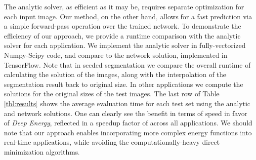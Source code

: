 \documentclass[journal]{IEEEtran}
\begin{document}
The analytic solver, as efficient as it may be, requires separate optimization for each input image. Our method, on the other hand, allows for a fast prediction via a simple forward-pass operation over the trained network. To demonstrate the efficiency of our approach, we provide a runtime comparison with the analytic solver for each application. We implement the analytic solver in fully-vectorized Numpy-Scipy code, and compare to the network solution, implemented in TensorFlow. Note that in seeded segmentation we compare the overall runtime of calculating the solution of the  images, along with the interpolation of the segmentation result back to original size. In other applications we compute the solutions for the original sizes of the test images.
The last row of Table \ref{tbl:results} shows the average evaluation time for each test set using the analytic and network solutions. One can clearly see the benefit in terms of speed in favor of \emph{Deep Energy}, reflected in a speedup factor of  across all applications. We should note that our approach enables incorporating more complex energy functions into real-time applications, while avoiding the computationally-heavy direct minimization algorithms.  
\end{document}

